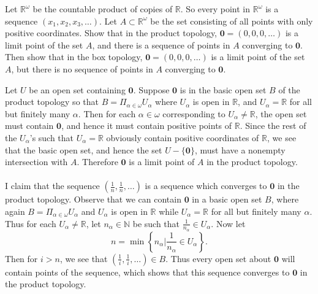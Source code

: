 \documentclass[a4paper,12pt,twoside]{hmcpset}
\begin{document}
\begin{exercise}[Exercise 4.41]
    Let $\mathbb{R}^\omega$ be the countable product of copies of
    $\mathbb{R}$. So every point in $\mathbb{R}^\omega$ is a sequence
    $(x_1, x_2, x_3, \dots).$ Let $A \subset \mathbb{R}^\omega$ be the set
    consisting of all points with only positive coordinates. Show that in
    the product topology, $\mathbf{0} = (0, 0, 0, \dots)$ is a limit point
    of the set $A$, and there is a sequence of points in $A$ converging to
    $\mathbf{0}$. Then show that in the box topology, $\mathbf{0} = (0, 0,
    0, \dots)$ is a limit point of the set $A$, but there is no sequence
    of points in $A$ converging to $\mathbf{0}$.
\end{exercise}

\begin{solution}
Let $U$ be an open set containing $\mathbf{0}$. Suppose $\mathbf{0}$ is in 
the basic open set $B$ of the product topology so that 
$B = \Pi_{\alpha \in \omega} U_\alpha$ where $U_\alpha$ is open 
in $\mathbb{R}$, and $U_\alpha = \mathbb{R}$ for all but finitely many 
$\alpha$. Then for each $\alpha \in \omega$ corresponding to $U_\alpha 
\ne \mathbb{R}$, the open set must contain $\mathbf{0}$, and hence it must contain
positive points of $\mathbb{R}$. Since the rest of the $U_\alpha$'s 
such that $U_\alpha = \mathbb{R}$ obviously contain positive coordinates of 
$\mathbb{R}$, we see that the basic open set, and hence the set $U - \{\mathbf{0}\}$, 
must have a
nonempty intersection with $A$. Therefore $\mathbf{0}$ is a limit point of 
$A$ in the product topology.
\\
\\
I claim that the sequence $(\frac{1}{n}, \frac{1}{n}, \dots )$
is a sequence which converges to $\mathbf{0}$ in the product topology. 
Observe that we can contain $\mathbf{0}$ in a
basic open set $B$, where again $B = \Pi_{\alpha \in \omega} U_\alpha$ and $U_\alpha$ is open 
in $\mathbb{R}$ while $U_\alpha = \mathbb{R}$ for all but finitely many 
$\alpha$. Thus for each $U_\alpha \ne \mathbb{R}$, let $n_\alpha \in \mathbb
{N}$ be such that $\frac{1}{n_\alpha} \in U_\alpha$. Now let 
$$
n = \min\left\{n_\alpha \Big| \frac{1}{n_\alpha} \in U_\alpha\right\}.
$$
Then for $i > n$, we see that $(\frac{1}{i}, \frac{1}{i}, \dots ) \in B$. 
Thus every open set about $\mathbf{0}$ will contain points of the sequence, which 
shows that this sequence converges to $\mathbf{0}$ in the product topology.
\\
\\

\end{solution}
\end{document}
